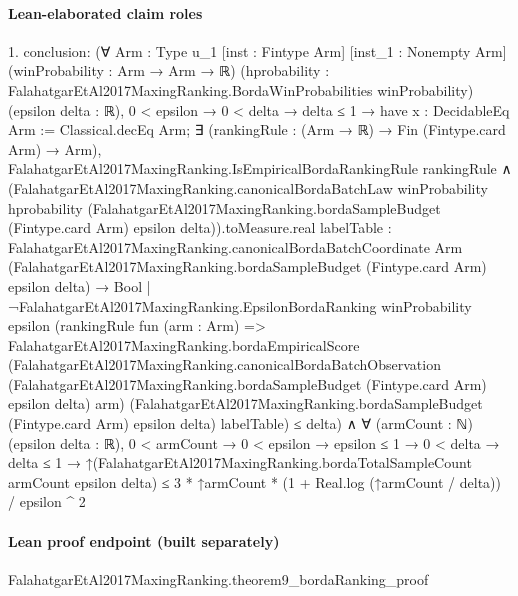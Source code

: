 \documentclass[10pt]{article}
\begin{document}
\paragraph{Lean-elaborated claim roles}\begin{ReviewVerbatim}
1. conclusion: (∀ {Arm : Type u_1} [inst : Fintype Arm] [inst_1 : Nonempty Arm] (winProbability : Arm → Arm → ℝ)
    (hprobability : FalahatgarEtAl2017MaxingRanking.BordaWinProbabilities winProbability) (epsilon delta : ℝ),
    0 < epsilon →
      0 < delta →
        delta ≤ 1 →
          have x : DecidableEq Arm := Classical.decEq Arm;
          ∃ (rankingRule : (Arm → ℝ) → Fin (Fintype.card Arm) → Arm),
            FalahatgarEtAl2017MaxingRanking.IsEmpiricalBordaRankingRule rankingRule ∧
              (FalahatgarEtAl2017MaxingRanking.canonicalBordaBatchLaw winProbability hprobability
                        (FalahatgarEtAl2017MaxingRanking.bordaSampleBudget (Fintype.card Arm) epsilon
                          delta)).toMeasure.real
                  {labelTable :
                    FalahatgarEtAl2017MaxingRanking.canonicalBordaBatchCoordinate Arm
                        (FalahatgarEtAl2017MaxingRanking.bordaSampleBudget (Fintype.card Arm) epsilon delta) →
                      Bool |
                    ¬FalahatgarEtAl2017MaxingRanking.EpsilonBordaRanking winProbability epsilon
                        (rankingRule fun (arm : Arm) =>
                          FalahatgarEtAl2017MaxingRanking.bordaEmpiricalScore
                            (FalahatgarEtAl2017MaxingRanking.canonicalBordaBatchObservation
                              (FalahatgarEtAl2017MaxingRanking.bordaSampleBudget (Fintype.card Arm) epsilon delta) arm)
                            (FalahatgarEtAl2017MaxingRanking.bordaSampleBudget (Fintype.card Arm) epsilon delta)
                            labelTable)} ≤
                delta) ∧
  ∀ (armCount : ℕ) (epsilon delta : ℝ),
    0 < armCount →
      0 < epsilon →
        epsilon ≤ 1 →
          0 < delta →
            delta ≤ 1 →
              ↑(FalahatgarEtAl2017MaxingRanking.bordaTotalSampleCount armCount epsilon delta) ≤
                3 * ↑armCount * (1 + Real.log (↑armCount / delta)) / epsilon ^ 2
\end{ReviewVerbatim}

\paragraph{Lean proof endpoint (built separately)}\begin{ReviewVerbatim}
FalahatgarEtAl2017MaxingRanking.theorem9_bordaRanking_proof
\end{ReviewVerbatim}
\end{document}
